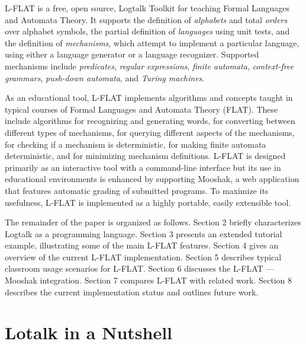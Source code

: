 \documentclass{llncs}
\begin{document}
L-FLAT \cite{lflat} is a free, open source, Logtalk \cite{pmoura03,lgtuserman2400} Toolkit for teaching Formal Languages and Automata Theory. It supports the definition of \textsl{alphabets} and total \textsl{orders} over alphabet symbols, the partial definition of \textsl{languages} using unit tests, and the definition of \textsl{mechanisms}, which attempt to implement a particular language, using either a language generator or a language recognizer. Supported mechanisms include \textsl{predicates}, \textsl{regular expressions}, \textsl{finite automata}, \textsl{context-free grammars}, \textsl{push-down automata}, and \textsl{Turing machines}.

As an educational tool, L-FLAT implements algorithms and concepts taught in typical courses of Formal Languages and Automata Theory (FLAT). These include algorithms for recognizing and generating words, for converting between different types of mechanisms, for querying different aspects of the mechanisms, for checking if a mechanism is deterministic, for making finite automata deterministic, and for minimizing mechanism definitions. L-FLAT is designed primarily as an interactive tool with a command-line interface but its use in educational environments is enhanced by supporting Mooshak, a web application that features automatic grading of submitted programs. To maximize its usefulness, L-FLAT is implemented as a highly portable, easily extensible tool.

The remainder of the paper is organized as follows. Section 2 briefly characterizes Logtalk as a programming language. Section 3 presents an extended tutorial example, illustrating some of the main L-FLAT features. Section 4 gives an overview of the current L-FLAT implementation. Section 5 describes typical classroom usage scenarios for L-FLAT. Section 6 discusses the L-FLAT --- Mooshak integration. Section 7 compares L-FLAT with related work. Section 8 describes the current implementation status and outlines future work.


\section{Lotalk in a Nutshell}
\end{document}
